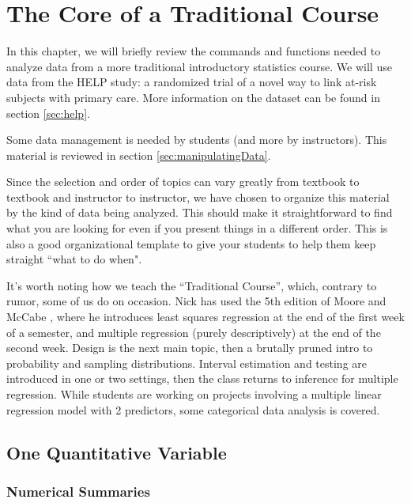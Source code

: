

\chapter{The Core of a Traditional Course}






In this chapter, we will briefly review the commands and functions needed
to analyze data from a more traditional introductory statistics course.
We will use data from the HELP study: a randomized trial of a novel 
way to link at-risk subjects with primary care.  More information on the
dataset can be found in section \ref{sec:help}.

Some data management is needed by students (and more by instructors).  This
material is reviewed in section \ref{sec:manipulatingData}.

Since the selection and order of topics can vary greatly from 
textbook to textbook and instructor to instructor, we have chosen to 
organize this material by the kind of data being analyzed.  This should make
it straightforward to find what you are looking for even if you present 
things in a different order.  This is also a good organizational template
to give your students to help them keep straight ``what to do when".

It's worth noting how we teach the ``Traditional Course'', which, contrary
to rumor, some of us do on occasion.  Nick has used the 5th edition of
Moore and McCabe \cite{moor:mcca:2006}, where he introduces least squares 
regression at the end of the first week of a semester, and multiple regression
(purely descriptively) at the end of the second week.  Design is the next
main topic, then a brutally pruned intro to probability and sampling distributions.
Interval estimation and testing are introduced in one or two settings, then 
the class returns to inference for multiple regression.  While students are working
on projects involving a multiple linear regression model with 2 predictors,
some categorical data analysis is covered.


\section{One Quantitative Variable}

\subsection{Numerical Summaries}

